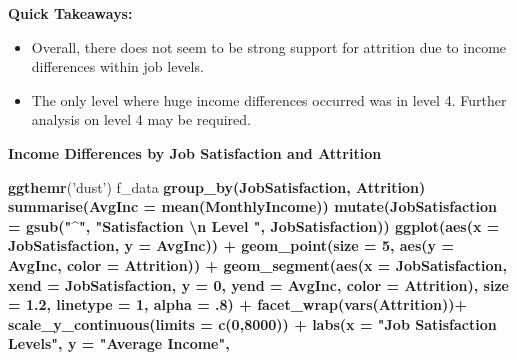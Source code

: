 \documentclass[
]{article}
\newenvironment{Shaded}{\begin{snugshade}}{\end{snugshade}}
\newcommand{\CharTok}[1]{\textcolor[rgb]{0.31,0.60,0.02}{#1}}
\newcommand{\DataTypeTok}[1]{\textcolor[rgb]{0.13,0.29,0.53}{#1}}
\newcommand{\DecValTok}[1]{\textcolor[rgb]{0.00,0.00,0.81}{#1}}
\newcommand{\FloatTok}[1]{\textcolor[rgb]{0.00,0.00,0.81}{#1}}
\newcommand{\KeywordTok}[1]{\textcolor[rgb]{0.13,0.29,0.53}{\textbf{#1}}}
\newcommand{\NormalTok}[1]{#1}
\newcommand{\OperatorTok}[1]{\textcolor[rgb]{0.81,0.36,0.00}{\textbf{#1}}}
\newcommand{\StringTok}[1]{\textcolor[rgb]{0.31,0.60,0.02}{#1}}
\providecommand{\tightlist}{%
  \setlength{\itemsep}{0pt}\setlength{\parskip}{0pt}}
\begin{document}
\textbf{Quick Takeaways:}

\begin{itemize}
\tightlist
\item
  Overall, there does not seem to be strong support for attrition due to
  income differences within job levels.
\item
  The only level where huge income differences occurred was in level 4.
  Further analysis on level 4 may be required.
\end{itemize}

\textbf{Income Differences by Job Satisfaction and Attrition}

\begin{Shaded}
\begin{Highlighting}[]
\KeywordTok{ggthemr}\NormalTok{(}\StringTok{'dust'}\NormalTok{)}
\NormalTok{f_data }\OperatorTok{%
\StringTok{  }\KeywordTok{group_by}\NormalTok{(JobSatisfaction, Attrition) }\OperatorTok{%
\StringTok{  }\KeywordTok{summarise}\NormalTok{(}\DataTypeTok{AvgInc =} \KeywordTok{mean}\NormalTok{(MonthlyIncome)) }\OperatorTok{%
\StringTok{  }\KeywordTok{mutate}\NormalTok{(}\DataTypeTok{JobSatisfaction =} \KeywordTok{gsub}\NormalTok{(}\StringTok{"^"}\NormalTok{, }\StringTok{"Satisfaction }\CharTok{\textbackslash{}n}\StringTok{ Level "}\NormalTok{, JobSatisfaction)) }\OperatorTok{%
\StringTok{  }\KeywordTok{ggplot}\NormalTok{(}\KeywordTok{aes}\NormalTok{(}\DataTypeTok{x =}\NormalTok{ JobSatisfaction, }\DataTypeTok{y =}\NormalTok{ AvgInc)) }\OperatorTok{+}
\StringTok{  }\KeywordTok{geom_point}\NormalTok{(}\DataTypeTok{size =} \DecValTok{5}\NormalTok{, }\KeywordTok{aes}\NormalTok{(}\DataTypeTok{y =}\NormalTok{ AvgInc, }\DataTypeTok{color =}\NormalTok{ Attrition)) }\OperatorTok{+}
\StringTok{  }\KeywordTok{geom_segment}\NormalTok{(}\KeywordTok{aes}\NormalTok{(}\DataTypeTok{x =}\NormalTok{ JobSatisfaction, }\DataTypeTok{xend =}\NormalTok{ JobSatisfaction, }\DataTypeTok{y =} \DecValTok{0}\NormalTok{, }
    \DataTypeTok{yend =}\NormalTok{ AvgInc, }\DataTypeTok{color =}\NormalTok{ Attrition), }\DataTypeTok{size =} \FloatTok{1.2}\NormalTok{, }\DataTypeTok{linetype =} \DecValTok{1}\NormalTok{, }\DataTypeTok{alpha =} \FloatTok{.8}\NormalTok{) }\OperatorTok{+}
\StringTok{  }\KeywordTok{facet_wrap}\NormalTok{(}\KeywordTok{vars}\NormalTok{(Attrition))}\OperatorTok{+}\StringTok{ }
\StringTok{  }\KeywordTok{scale_y_continuous}\NormalTok{(}\DataTypeTok{limits =} \KeywordTok{c}\NormalTok{(}\DecValTok{0}\NormalTok{,}\DecValTok{8000}\NormalTok{)) }\OperatorTok{+}
\StringTok{  }\KeywordTok{labs}\NormalTok{(}\DataTypeTok{x =} \StringTok{"Job Satisfaction Levels"}\NormalTok{, }\DataTypeTok{y =} \StringTok{"Average Income"}\NormalTok{, }
}}}}
\end{Highlighting}
\end{Shaded}
\end{document}
